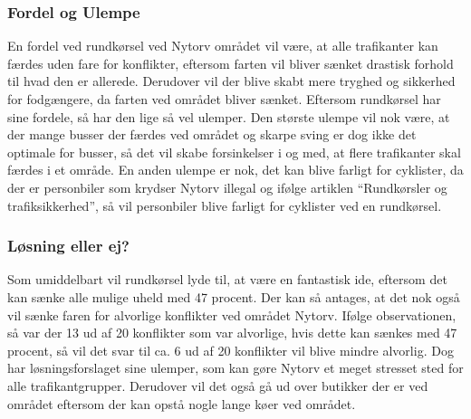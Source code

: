 \subsubsection{Fordel og Ulempe}
\label{subs:fordel_og_ulempe}
En fordel ved rundkørsel ved Nytorv området vil være, at alle trafikanter kan færdes uden fare for konflikter, eftersom farten vil bliver sænket drastisk forhold til hvad den er allerede. Derudover vil der blive skabt mere tryghed og sikkerhed for fodgængere, da farten ved området bliver sænket. Eftersom rundkørsel har sine fordele, så har den lige så vel ulemper. Den største ulempe vil nok være, at der mange busser der færdes ved området og skarpe sving er dog ikke det optimale for busser, så det vil skabe forsinkelser i og med, at flere trafikanter skal færdes i et område. En anden ulempe er nok, det kan blive farligt for cyklister, da der er personbiler som krydser Nytorv illegal og ifølge artiklen “Rundkørsler og trafiksikkerhed”, så vil personbiler blive farligt for cyklister ved en rundkørsel.

\subsubsection{Løsning eller ej?}
\label{subs:Losning}

Som umiddelbart vil rundkørsel lyde til, at være en fantastisk ide, eftersom det kan sænke alle mulige uheld med 47 procent. Der kan så antages, at det nok også vil sænke faren for alvorlige konflikter ved området Nytorv. Ifølge observationen, så var der 13 ud af 20 konflikter som var alvorlige, hvis dette kan sænkes med 47 procent, så vil det svar til ca. 6 ud af 20 konflikter vil blive mindre alvorlig. Dog har løsningsforslaget sine ulemper, som kan gøre Nytorv et meget stresset sted for alle trafikantgrupper. Derudover vil det også gå ud over butikker der er  ved området eftersom der kan opstå nogle lange køer ved området.
